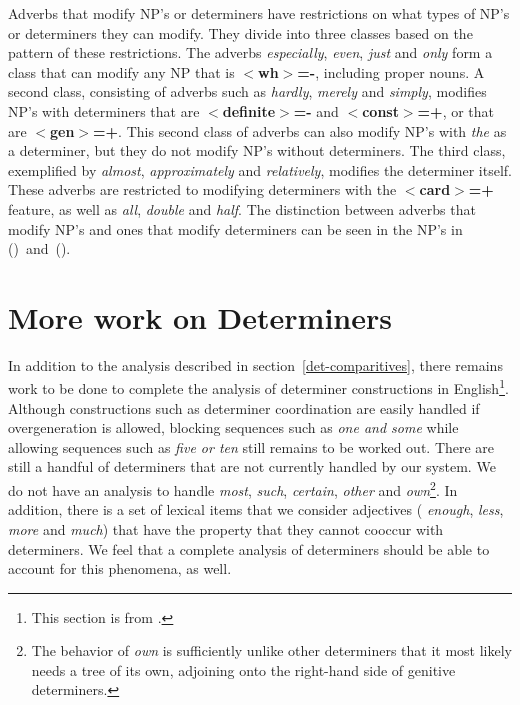 Adverbs that modify NP's or determiners have restrictions on what types of NP's
or determiners they can modify. They divide into three classes based on the
pattern of these restrictions.  The adverbs {\it especially}, {\it even}, {\it
just} and {\it only} form a class that can modify any NP that is {\bf
$<$wh$>$=-}, including proper nouns.  A second class, consisting of adverbs
such as {\it hardly}, {\it merely} and {\it simply}, modifies NP's with
determiners that are {\bf $<$definite$>$=-} and {\bf $<$const$>$=+}, or that
are {\bf $<$gen$>$=+}.  This second class of adverbs can also modify NP's with
{\it the} as a determiner, but they do not modify NP's without determiners.
The third class, exemplified by {\it almost}, {\it approximately} and {\it
relatively}, modifies the determiner itself.  These adverbs are restricted to
modifying determiners with the {\bf $<$card$>$=+} feature, as well as {\it
all}, {\it double} and {\it half}.  The distinction between adverbs that modify
NP's and ones that modify determiners can be seen in the NP's in
({})~and~({}).





\section{More work on Determiners}

In addition to the analysis described in section~\ref{det-comparitives}, there
remains work to be done to complete the analysis of determiner constructions in
English\footnote{This section is from \cite{HockeyEgedi94}.}.  Although
constructions such as determiner coordination are easily handled if
overgeneration is allowed, blocking sequences such as {\it one and some} while
allowing sequences such as {\it five or ten} still remains to be worked out.
There are still a handful of determiners that are not currently handled by our
system.  We do not have an analysis to handle {\it most}, {\it such}, {\it
certain}, {\it other} and {\it own}\footnote{The behavior of {\it own} is
sufficiently unlike other determiners that it most likely needs a tree of its
own, adjoining onto the right-hand side of genitive determiners.}.  In
addition, there is a set of lexical items that we consider adjectives ({\it
enough}, {\it less}, {\it more} and {\it much}) that have the property that
they cannot cooccur with determiners.  We feel that a complete analysis of
determiners should be able to account for this phenomena, as well.





